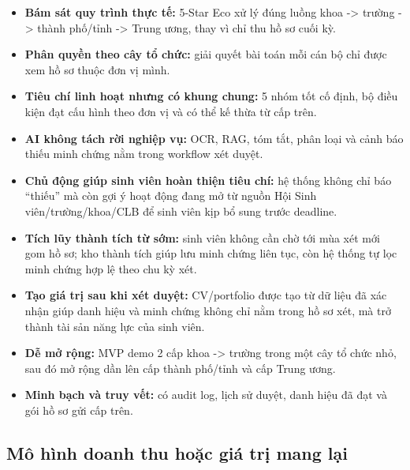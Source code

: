 \begin{itemize}
    \item \textbf{Bám sát quy trình thực tế:} 5-Star Eco xử lý đúng luồng khoa -{}> trường -{}> thành phố/tỉnh -{}> Trung ương, thay vì chỉ thu hồ sơ cuối kỳ.
    \item \textbf{Phân quyền theo cây tổ chức:} giải quyết bài toán mỗi cán bộ chỉ được xem hồ sơ thuộc đơn vị mình.
    \item \textbf{Tiêu chí linh hoạt nhưng có khung chung:} 5 nhóm tốt cố định, bộ điều kiện đạt cấu hình theo đơn vị và có thể kế thừa từ cấp trên.
    \item \textbf{AI không tách rời nghiệp vụ:} OCR, RAG, tóm tắt, phân loại và cảnh báo thiếu minh chứng nằm trong workflow xét duyệt.
    \item \textbf{Chủ động giúp sinh viên hoàn thiện tiêu chí:} hệ thống không chỉ báo ``thiếu'' mà còn gợi ý hoạt động đang mở từ nguồn Hội Sinh viên/trường/khoa/CLB để sinh viên kịp bổ sung trước deadline.
    \item \textbf{Tích lũy thành tích từ sớm:} sinh viên không cần chờ tới mùa xét mới gom hồ sơ; kho thành tích giúp lưu minh chứng liên tục, còn hệ thống tự lọc minh chứng hợp lệ theo chu kỳ xét.
    \item \textbf{Tạo giá trị sau khi xét duyệt:} CV/portfolio được tạo từ dữ liệu đã xác nhận giúp danh hiệu và minh chứng không chỉ nằm trong hồ sơ xét, mà trở thành tài sản năng lực của sinh viên.
    \item \textbf{Dễ mở rộng:} MVP demo 2 cấp khoa -{}> trường trong một cây tổ chức nhỏ, sau đó mở rộng dần lên cấp thành phố/tỉnh và cấp Trung ương.
    \item \textbf{Minh bạch và truy vết:} có audit log, lịch sử duyệt, danh hiệu đã đạt và gói hồ sơ gửi cấp trên.
\end{itemize}

\subsection{Mô hình doanh thu hoặc giá trị mang lại}

\begingroup
\small
\setlength{\tabcolsep}{4pt}
\renewcommand{\arraystretch}{1.25}

